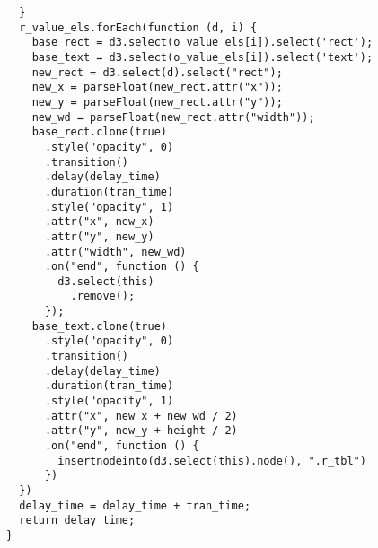 \begin{lstlisting}
  }
  r_value_els.forEach(function (d, i) {
    base_rect = d3.select(o_value_els[i]).select('rect');
    base_text = d3.select(o_value_els[i]).select('text');
    new_rect = d3.select(d).select("rect");
    new_x = parseFloat(new_rect.attr("x"));
    new_y = parseFloat(new_rect.attr("y"));
    new_wd = parseFloat(new_rect.attr("width"));
    base_rect.clone(true)
      .style("opacity", 0)
      .transition()
      .delay(delay_time)
      .duration(tran_time)
      .style("opacity", 1)
      .attr("x", new_x)
      .attr("y", new_y)
      .attr("width", new_wd)
      .on("end", function () {
        d3.select(this)
          .remove();
      });
    base_text.clone(true)
      .style("opacity", 0)
      .transition()
      .delay(delay_time)
      .duration(tran_time)
      .style("opacity", 1)
      .attr("x", new_x + new_wd / 2)
      .attr("y", new_y + height / 2)
      .on("end", function () {
        insertnodeinto(d3.select(this).node(), ".r_tbl")
      })
  })
  delay_time = delay_time + tran_time;
  return delay_time;
}


\end{lstlisting}
